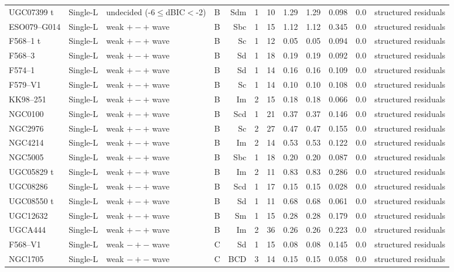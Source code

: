 \documentclass[10pt]{article}
\begin{document}
\begin{landscape}
{\begin{longtable}{llllrrrrrrrl}
UGC07399 t & Single-L & undecided (-6$\le$dBIC$<$-2) & B & Sdm & 1 & 10 & 1.29 & 1.29 & 0.098 & 0.0 & structured residuals\\
ESO079--G014 & Single-L & weak $+-+$ wave & B & Sbc & 1 & 15 & 1.12 & 1.12 & 0.345 & 0.0 & structured residuals\\
F568--1 t & Single-L & weak $+-+$ wave & B & Sc & 1 & 12 & 0.05 & 0.05 & 0.094 & 0.0 & structured residuals\\
F568--3 & Single-L & weak $+-+$ wave & B & Sd & 1 & 18 & 0.19 & 0.19 & 0.092 & 0.0 & structured residuals\\
F574--1 & Single-L & weak $+-+$ wave & B & Sd & 1 & 14 & 0.16 & 0.16 & 0.109 & 0.0 & structured residuals\\
F579--V1 & Single-L & weak $+-+$ wave & B & Sc & 1 & 14 & 0.10 & 0.10 & 0.108 & 0.0 & structured residuals\\
KK98--251 & Single-L & weak $+-+$ wave & B & Im & 2 & 15 & 0.18 & 0.18 & 0.066 & 0.0 & structured residuals\\
NGC0100 & Single-L & weak $+-+$ wave & B & Scd & 1 & 21 & 0.37 & 0.37 & 0.146 & 0.0 & structured residuals\\
NGC2976 & Single-L & weak $+-+$ wave & B & Sc & 2 & 27 & 0.47 & 0.47 & 0.155 & 0.0 & structured residuals\\
NGC4214 & Single-L & weak $+-+$ wave & B & Im & 2 & 14 & 0.53 & 0.53 & 0.122 & 0.0 & structured residuals\\
NGC5005 & Single-L & weak $+-+$ wave & B & Sbc & 1 & 18 & 0.20 & 0.20 & 0.087 & 0.0 & structured residuals\\
UGC05829 t & Single-L & weak $+-+$ wave & B & Im & 2 & 11 & 0.83 & 0.83 & 0.286 & 0.0 & structured residuals\\
UGC08286 & Single-L & weak $+-+$ wave & B & Scd & 1 & 17 & 0.15 & 0.15 & 0.028 & 0.0 & structured residuals\\
UGC08550 t & Single-L & weak $+-+$ wave & B & Sd & 1 & 11 & 0.68 & 0.68 & 0.061 & 0.0 & structured residuals\\
UGC12632 & Single-L & weak $+-+$ wave & B & Sm & 1 & 15 & 0.28 & 0.28 & 0.179 & 0.0 & structured residuals\\
UGCA444 & Single-L & weak $+-+$ wave & B & Im & 2 & 36 & 0.26 & 0.26 & 0.223 & 0.0 & structured residuals\\
F568--V1 & Single-L & weak $-+-$ wave & C & Sd & 1 & 15 & 0.08 & 0.08 & 0.145 & 0.0 & structured residuals\\
NGC1705 & Single-L & weak $-+-$ wave & C & BCD & 3 & 14 & 0.15 & 0.15 & 0.058 & 0.0 & structured residuals\\

\end{longtable}}
\end{landscape}
\end{document}
